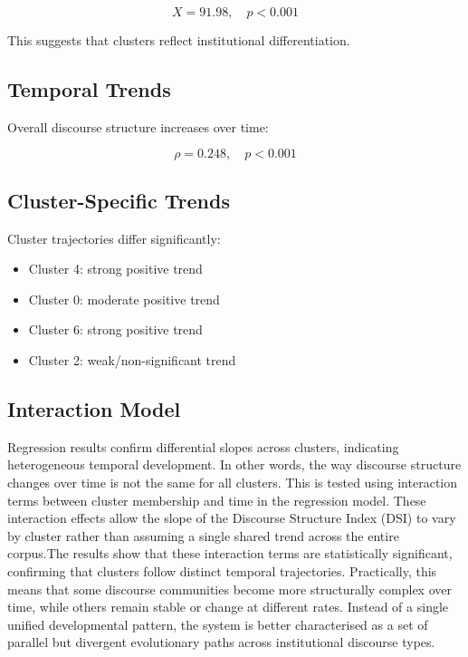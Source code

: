 \documentclass[11pt]{article}
\begin{document}
\begin{equation*}
X = 91.98, \quad p < 0.001
\end{equation*}

This suggests that clusters reflect institutional differentiation.



\subsection{Temporal Trends}



Overall discourse structure increases over time:



\begin{equation*}
\rho = 0.248,\quad p < 0.001
\end{equation*}



\subsection{Cluster-Specific Trends}



Cluster trajectories differ significantly:



\begin{itemize}

\item Cluster 4: strong positive trend

\item Cluster 0: moderate positive trend

\item Cluster 6: strong positive trend

\item Cluster 2: weak/non-significant trend

\end{itemize}



\subsection{Interaction Model}

Regression results confirm differential slopes across clusters, indicating heterogeneous temporal development. 
In other words, the way discourse structure changes over time is not the same for all clusters.
This is tested using interaction terms between cluster membership and time in the regression model. 
These interaction effects allow the slope of the Discourse Structure Index (DSI) to vary by cluster 
rather than assuming a single shared trend across the entire corpus.The results show that these interaction 
terms are statistically significant, confirming that clusters follow distinct temporal trajectories. 
Practically, this means that some discourse communities become more structurally complex over time, while 
others remain stable or change at different rates. Instead of a single unified developmental pattern, the 
system is better characterised as a set of parallel but divergent evolutionary paths across institutional discourse types.
\end{document}
